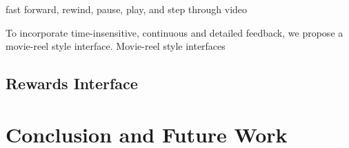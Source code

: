 \documentclass[letterpaper, 10 pt, conference]{ieeeconf}
\begin{document}
fast forward, rewind, pause, play, and step through video 

To incorporate time-insensitive, continuous and detailed feedback, we propose a movie-reel style interface. Movie-reel style interfaces 


\subsection{Rewards Interface}



\section{Conclusion and Future Work}


\end{document}
